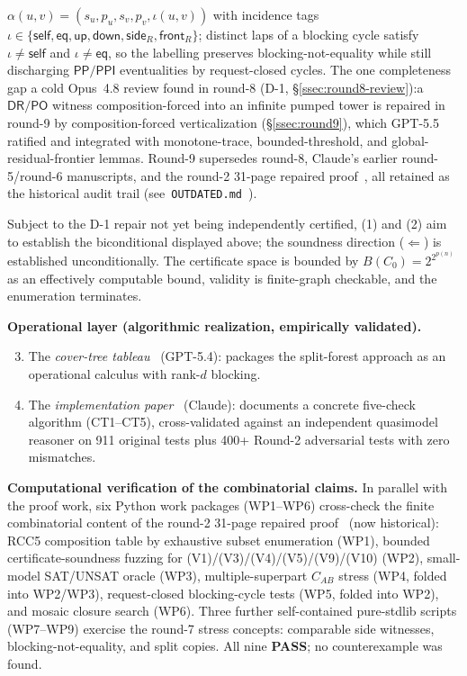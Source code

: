 \documentclass[
]{ceurart}
\theoremstyle{definition}
\newcommand{\DR}{\ensuremath{\mathsf{DR}}}
\newcommand{\PO}{\ensuremath{\mathsf{PO}}}
\newcommand{\PP}{\ensuremath{\mathsf{PP}}}
\newcommand{\PPI}{\ensuremath{\mathsf{PPI}}}
\newcommand{\self}{\ensuremath{\mathsf{self}}}
\newcommand{\eqtag}{\ensuremath{\mathsf{eq}}}
\newcommand{\up}{\ensuremath{\mathsf{up}}}
\newcommand{\down}{\ensuremath{\mathsf{down}}}
\newcommand{\side}{\ensuremath{\mathsf{side}}}
\newcommand{\front}{\ensuremath{\mathsf{front}}}
\begin{document}
\begin{enumerate}
    $\alpha(u,v)=(s_u,p_u,s_v,p_v,\iota(u,v))$ with incidence
    tags $\iota\in\{\self,\eqtag,\up,\down,\side_R,\front_R\}$;
    distinct laps of a blocking cycle satisfy $\iota\ne\self$ and
    $\iota\ne\eqtag$, so the labelling preserves
    blocking-not-equality while still discharging
    $\PP/\PPI$ eventualities by request-closed cycles.  The one
    completeness gap a cold Opus~4.8 review found in round-8 (D-1,
    \S\ref{ssec:round8-review}):\@ a $\DR/\PO$ witness
    composition-forced into an infinite pumped tower is repaired in
    round-9 by composition-forced verticalization
    (\S\ref{ssec:round9}), which GPT-5.5 ratified and integrated
    with monotone-trace, bounded-threshold, and global-residual-frontier
    lemmas.  Round-9 supersedes round-8, Claude's earlier
    round-5/round-6 manuscripts, and the round-2 31-page repaired
    proof~\cite{GPT55Repaired}, all retained as the historical audit
    trail (see~\texttt{OUTDATED.md}~\cite{ALCIRCC5Outdated}).
\end{enumerate}
Subject to the D-1 repair not yet being independently certified,
(1) and (2) aim to establish the biconditional displayed above; the
soundness direction ($\Leftarrow$) is established unconditionally.  The certificate
space is bounded by $B(C_0) = 2^{2^{p(n)}}$ as an effectively
computable bound, validity is finite-graph checkable, and the
enumeration terminates.

\medskip\noindent\textbf{Operational layer (algorithmic
realization, empirically validated).}
\begin{enumerate}\setcounter{enumi}{2}
  \item The \emph{cover-tree tableau}~\cite{CoverTree} (GPT-5.4):
    packages the split-forest approach as an operational calculus
    with rank-$d$ blocking.
  \item The \emph{implementation paper}~\cite{CoverTreeImpl}
    (Claude): documents a concrete five-check algorithm (CT1--CT5),
    cross-validated against an independent quasimodel reasoner on
    911 original tests plus 400+ Round-2 adversarial tests with
    zero mismatches.
\end{enumerate}

\medskip\noindent\textbf{Computational verification of the
combinatorial claims.}  In parallel with the proof work, six
Python work packages (WP1--WP6) cross-check the finite
combinatorial content of the round-2 31-page repaired
proof~\cite{GPT55Repaired} (now historical):  RCC5 composition
table by exhaustive subset enumeration (WP1), bounded
certificate-soundness fuzzing for (V1)/(V3)/(V4)/(V5)/(V9)/(V10)
(WP2), small-model SAT/UNSAT oracle (WP3), multiple-superpart
$C_{AB}$ stress (WP4, folded into WP2/WP3), request-closed
blocking-cycle tests (WP5, folded into WP2), and mosaic closure
search (WP6).  Three further self-contained pure-stdlib scripts
(WP7--WP9) exercise the round-7 stress concepts: comparable side
witnesses, blocking-not-equality, and split copies.  All nine
\textbf{PASS}; no counterexample was found.
\end{document}
